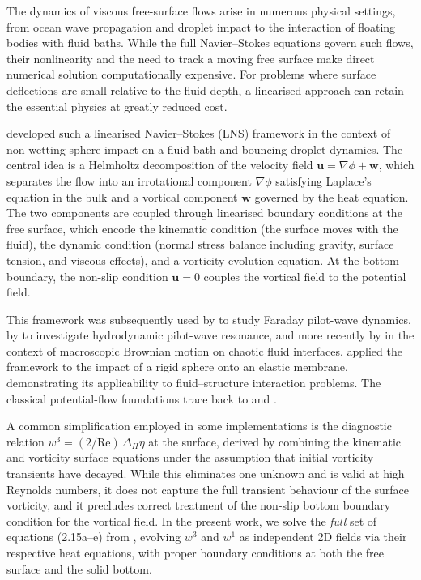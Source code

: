 \documentclass{article}
\newcommand{\Rey}{\mathrm{Re}}
\newcommand{\uu}{\mathbf{u}}
\newcommand{\ww}{\mathbf{w}}
\begin{document}
The dynamics of viscous free-surface flows arise in numerous physical settings, from ocean wave propagation and droplet impact to the interaction of floating bodies with fluid baths.
While the full Navier--Stokes equations govern such flows, their nonlinearity and the need to track a moving free surface make direct numerical solution computationally expensive.
For problems where surface deflections are small relative to the fluid depth, a linearised approach can retain the essential physics at greatly reduced cost.

\citet{GaleanoRiosEtAl2017} developed such a linearised Navier--Stokes (LNS) framework in the context of non-wetting sphere impact on a fluid bath and bouncing droplet dynamics.
The central idea is a Helmholtz decomposition of the velocity field $\uu = \nabla\phi + \ww$, which separates the flow into an irrotational component $\nabla\phi$ satisfying Laplace's equation in the bulk and a vortical component $\ww$ governed by the heat equation.
The two components are coupled through linearised boundary conditions at the free surface, which encode the kinematic condition (the surface moves with the fluid), the dynamic condition (normal stress balance including gravity, surface tension, and viscous effects), and a vorticity evolution equation.
At the bottom boundary, the non-slip condition $\uu = 0$ couples the vortical field to the potential field.

This framework was subsequently used by \citet{MilweskiEtAl2015} to study Faraday pilot-wave dynamics, by \citet{GaleanoRios2016} to investigate hydrodynamic pilot-wave resonance, and more recently by \citet{Barotta2025} in the context of macroscopic Brownian motion on chaotic fluid interfaces.
\citet{AgueroEtAl2022} applied the framework to the impact of a rigid sphere onto an elastic membrane, demonstrating its applicability to fluid--structure interaction problems.
The classical potential-flow foundations trace back to \citet{Lamb1932} and \citet{Batchelor1967}.

A common simplification employed in some implementations is the diagnostic relation $w^3 = (2/\Rey)\,\Delta_H\eta$ at the surface, derived by combining the kinematic and vorticity surface equations under the assumption that initial vorticity transients have decayed.
While this eliminates one unknown and is valid at high Reynolds numbers, it does not capture the full transient behaviour of the surface vorticity, and it precludes correct treatment of the non-slip bottom boundary condition for the vortical field.
In the present work, we solve the \emph{full} set of equations (2.15a--e) from \citet{GaleanoRiosEtAl2017}, evolving $w^3$ and $w^1$ as independent 2D fields via their respective heat equations, with proper boundary conditions at both the free surface and the solid bottom.
\end{document}
